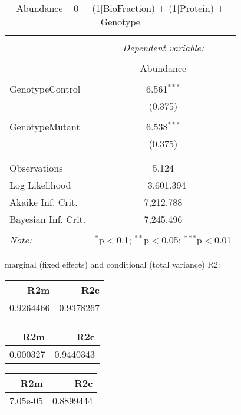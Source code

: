 \documentclass[11pt]{report}
\begin{document}
\begin{table}[!htbp] \centering 
  \caption{Abundance ~ 0 + (1|BioFraction) + (1|Protein) + Genotype} 
  \label{} 
\begin{tabular}{@{\extracolsep{5pt}}lc} 
\\[-1.8ex]\hline 
\hline \\[-1.8ex] 
 & \multicolumn{1}{c}{\textit{Dependent variable:}} \\ 
\cline{2-2} 
\\[-1.8ex] & Abundance \\ 
\hline \\[-1.8ex] 
 GenotypeControl & 6.561$^{***}$ \\ 
  & (0.375) \\ 
  & \\ 
 GenotypeMutant & 6.538$^{***}$ \\ 
  & (0.375) \\ 
  & \\ 
\hline \\[-1.8ex] 
Observations & 5,124 \\ 
Log Likelihood & $-$3,601.394 \\ 
Akaike Inf. Crit. & 7,212.788 \\ 
Bayesian Inf. Crit. & 7,245.496 \\ 
\hline 
\hline \\[-1.8ex] 
\textit{Note:}  & \multicolumn{1}{r}{$^{*}$p$<$0.1; $^{**}$p$<$0.05; $^{***}$p$<$0.01} \\ 
\end{tabular} 
\end{table} 
marginal (fixed effects) and conditional (total variance) R2:

\begin{tabular}{r|r}
\hline
R2m & R2c\\
\hline
0.9264466 & 0.9378267\\
\hline
\end{tabular}

\begin{tabular}{r|r}
\hline
R2m & R2c\\
\hline
0.000327 & 0.9440343\\
\hline
\end{tabular}

\begin{tabular}{r|r}
\hline
R2m & R2c\\
\hline
7.05e-05 & 0.8899444\\
\hline
\end{tabular}
\end{document}

